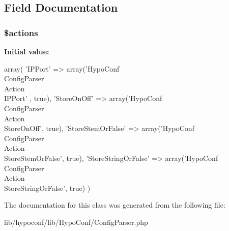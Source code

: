 \subsection{\-Field \-Documentation}
\hypertarget{class_hypo_conf_1_1_config_parser_a6cafc5f8d4f5d73acc0b5c6daaa766c1}{
\subsubsection[{\$actions}]{\setlength{\rightskip}{0pt plus 5cm}\$actions}}
\label{class_hypo_conf_1_1_config_parser_a6cafc5f8d4f5d73acc0b5c6daaa766c1}
{\bfseries \-Initial value\-:}
\begin{DoxyCode}
 array(
        'IPPort'              => array('HypoConf\\ConfigParser\\Action\\IPPort'
      , true),
        'StoreOnOff'          => array('HypoConf\\ConfigParser\\Action\\
      StoreOnOff', true),
        'StoreStemOrFalse'    => array('HypoConf\\ConfigParser\\Action\\
      StoreStemOrFalse', true),
        'StoreStringOrFalse'  => array('HypoConf\\ConfigParser\\Action\\
      StoreStringOrFalse', true)
    )
\end{DoxyCode}


\-The documentation for this class was generated from the following file\-:\begin{DoxyCompactItemize}
\item 
lib/hypoconf/lib/\-Hypo\-Conf/\-Config\-Parser.\-php\end{DoxyCompactItemize}
